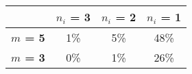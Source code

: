 \begin{tabular}{|l|c|c|c|}
\hline
&\textbf{$n_i$ = 3}&\textbf{$n_i$ = 2}&\textbf{$n_i$ = 1}\\\hline
\textbf{$m$ = 5}&1\%&5\%&48\%\\\hline
\textbf{$m$ = 3}&0\%&1\%&26\%\\\hline
\end{tabular}
